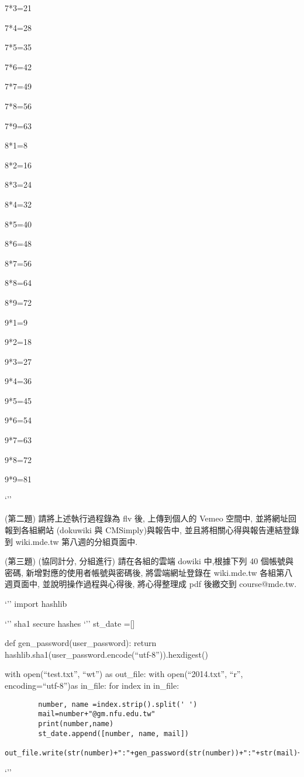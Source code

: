 \documentclass[]{article}
\begin{document}
7*3=21

7*4=28

7*5=35

7*6=42

7*7=49

7*8=56

7*9=63

8*1=8

8*2=16

8*3=24

8*4=32

8*5=40

8*6=48

8*7=56

8*8=64

8*9=72

9*1=9

9*2=18

9*3=27

9*4=36

9*5=45

9*6=54

9*7=63

9*8=72

9*9=81

`''

(第二題) 請將上述執行過程錄為 flv 後, 上傳到個人的 Vemeo 空間中,
並將網址回報到各組網站 (dokuwiki 與 CMSimply)與報告中,
並且將相關心得與報告連結登錄到 wiki.mde.tw 第八週的分組頁面中.

(第三題) (協同計分, 分組進行) 請在各組的雲端 dowiki 中,根據下列 40
個帳號與密碼, 新增對應的使用者帳號與密碼後, 將雲端網址登錄在 wiki.mde.tw
各組第八週頁面中, 並說明操作過程與心得後, 將心得整理成 pdf 後繳交到
course@mde.tw.

`'' import hashlib

`'' sha1 secure hashes `'' st\_date ={[}{]}

def gen\_password(user\_password): return
hashlib.sha1(user\_password.encode(``utf-8'')).hexdigest()

with open(``test.txt'', ``wt'') as out\_file: with open(``2014.txt'',
``r'', encoding=``utf-8'')as in\_file: for index in in\_file:

\begin{verbatim}
        number, name =index.strip().split(' ')
        mail=number+"@gm.nfu.edu.tw"
        print(number,name)
        st_date.append([number, name, mail])
        out_file.write(str(number)+":"+gen_password(str(number))+":"+str(mail)+":user"+"\n")
\end{verbatim}

`''
\end{document}
